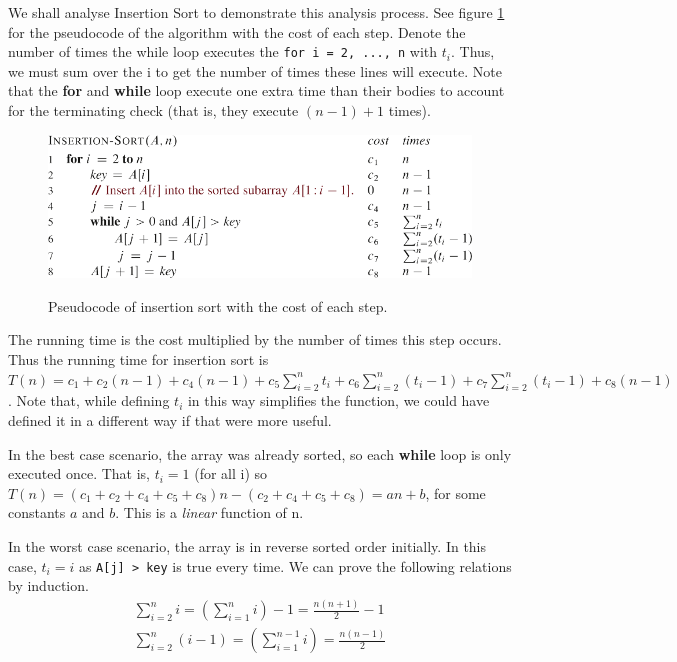 \documentclass[12pt]{article}
\begin{document}
We shall analyse Insertion Sort to demonstrate this analysis process. See figure \ref{Figure: insertion sort with costs} for the pseudocode
of the algorithm with the cost of each step. Denote the number of times the while loop executes the \texttt{for i = 2, ..., n} with $t_i$.
Thus, we must sum over the i to get the number of times these lines will execute. Note that the \textbf{for}
and \textbf{while} loop execute one extra time than their bodies to account for the terminating check (that is, they execute $(n - 1) + 1$ times).
\begin{figure}[ht]\centering\label{Figure: insertion sort with costs}
    \includegraphics[angle=0]{Figures/insertion-sort-with-costs.pdf}
    \caption{Pseudocode of insertion sort with the cost of each step.}
\end{figure}
The running time is the cost multiplied by the number of times this step occurs. Thus the running time
for insertion sort is $T(n) = c_1 + c_2(n - 1) + c_4(n - 1) + c_5\sum_{i = 2}^{n}t_i + c_6\sum_{i = 2}^{n}(t_i - 1)
+ c_7\sum_{i = 2}^{n}(t_i - 1) + c_8(n - 1)$. Note that, while defining $t_i$ in this way simplifies the function, we could have defined it in a different
way if that were more useful.

In the best case scenario, the array was already sorted, so each \textbf{while} loop is only executed
once. That is, $t_i = 1$ (for all i) so $T(n) = (c_1 + c_2 + c_4 + c_5 + c_8)n - (c_2 + c_4 + c_5 + c_8) = an + b$, for
some constants $a$ and $b$. This is a \textit{linear} function of n.

In the worst case scenario, the array is in reverse sorted order initially. In this case, $t_i = i$ as \texttt{A[j] > key} is
true every time. We can prove the following relations by induction.
\begin{eqnarray*}
    \sum_{i = 2}^{n}i = \left(\sum_{i = 1}^{n}i\right) - 1 = \frac{n(n + 1)}{2} - 1\\
    \sum_{i = 2}^{n}(i - 1) = \left(\sum_{i = 1}^{n - 1}i\right) = \frac{n(n - 1)}{2}
\end{eqnarray*}
\end{document}
